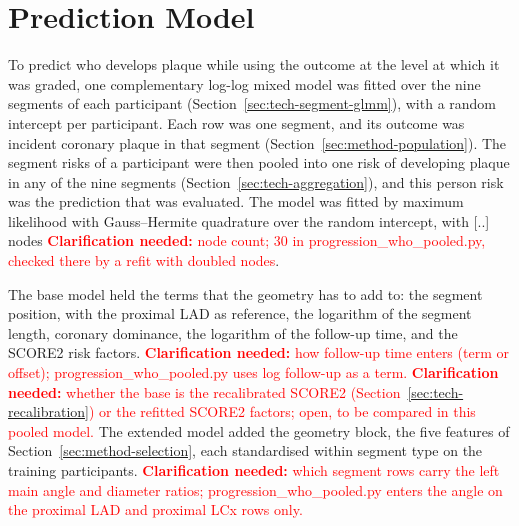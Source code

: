 \providecommand{\clarify}[1]{\textcolor{red}{\textbf{Clarification needed:} #1}}
\section{Prediction Model}
\label{sec:method-models}

To predict who develops plaque while using the outcome at the level at which it was graded, one complementary log-log mixed model was fitted over the nine segments of each participant (Section~\ref{sec:tech-segment-glmm}), with a random intercept per participant.
Each row was one segment, and its outcome was incident coronary plaque in that segment (Section~\ref{sec:method-population}).
The segment risks of a participant were then pooled into one risk of developing plaque in any of the nine segments (Section~\ref{sec:tech-aggregation}), and this person risk was the prediction that was evaluated.
The model was fitted by maximum likelihood with Gauss--Hermite quadrature over the random intercept, with [..] nodes \clarify{node count; 30 in progression\_who\_pooled.py, checked there by a refit with doubled nodes}.

The base model held the terms that the geometry has to add to: the segment position, with the proximal LAD as reference, the logarithm of the segment length, coronary dominance, the logarithm of the follow-up time, and the SCORE2 risk factors.
\clarify{how follow-up time enters (term or offset); progression\_who\_pooled.py uses log follow-up as a term.}
\clarify{whether the base is the recalibrated SCORE2 (Section~\ref{sec:tech-recalibration}) or the refitted SCORE2 factors; open, to be compared in this pooled model.}
The extended model added the geometry block, the five features of Section~\ref{sec:method-selection}, each standardised within segment type on the training participants.
\clarify{which segment rows carry the left main angle and diameter ratios; progression\_who\_pooled.py enters the angle on the proximal LAD and proximal LCx rows only.}

